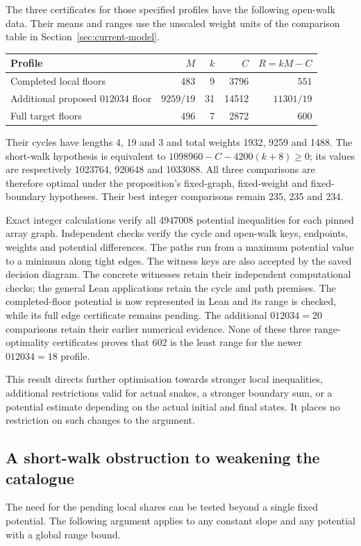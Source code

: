 \documentclass[11pt,a4paper]{article}
\theoremstyle{definition}
\theoremstyle{remark}
\begin{document}
The three certificates for those specified profiles have the following
open-walk data. Their means and ranges use the unscaled weight units of
the comparison table in Section~\ref{sec:current-model}.
\begin{center}\small
\begin{tabular}{l r r r r}
\toprule
Profile & $M$ & $k$ & $C$ & $R=kM-C$\\\midrule
Completed local floors & $483$ & 9 & 3796 & $551$\\
Additional proposed $012034$ floor & $9259/19$ & 31 & 14512 & $11301/19$\\
Full target floors & $496$ & 7 & 2872 & $600$\\
\bottomrule
\end{tabular}
\end{center}
Their cycles have lengths 4, 19 and 3 and total weights 1932, 9259 and 1488.
The short-walk hypothesis is equivalent to
$1098960-C-4200(k+8)\ge0$; its values are respectively 1023764, 920648 and
1033088. All three comparisons are therefore optimal under the proposition's
fixed-graph, fixed-weight and fixed-boundary hypotheses. Their best integer
comparisons remain 235, 235 and 234.

Exact integer calculations verify all 4947008 potential inequalities for
each pinned array graph. Independent checks verify the cycle and open-walk
keys, endpoints, weights and potential differences. The paths run from a
maximum potential value to a minimum along tight edges. The witness keys
are also accepted by the saved decision diagram. The concrete witnesses retain their independent computational checks;
the general Lean applications retain the cycle and path premises. The
completed-floor potential is now represented in Lean and its range is
checked, while its full edge certificate remains pending. The additional
$012034=20$ comparisons retain their earlier numerical evidence. None of
these three range-optimality certificates proves that 602 is the least
range for the newer $012034=18$ profile.

This result directs further optimisation towards stronger local inequalities,
additional restrictions valid for actual snakes, a stronger boundary sum,
or a potential estimate depending on the actual initial and final states.
It places no restriction on such changes to the argument.

\subsection{A short-walk obstruction to weakening the catalogue}\label{sec:short-walk}
The need for the pending local shares can be tested beyond a single fixed potential. The following argument applies to any constant slope and any potential with a global range bound.
\end{document}
